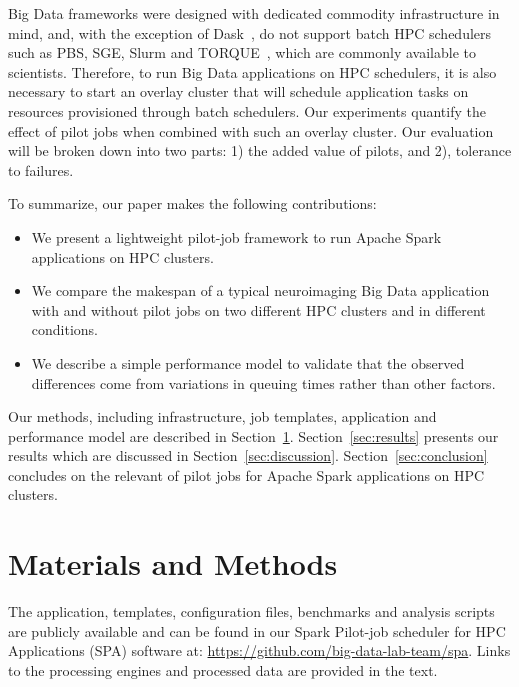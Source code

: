 \documentclass{IEEEtran}
\begin{document}
Big Data frameworks were designed with dedicated commodity infrastructure
in mind, and, with the exception of Dask~\cite{rocklin2015dask}, do not support batch
HPC schedulers such as PBS, SGE, Slurm and TORQUE~\cite{schedulers}, which
are commonly available to scientists. Therefore, to run Big Data
applications on HPC schedulers, it is also necessary to start an overlay
cluster that will schedule application tasks on resources provisioned
through batch schedulers. Our experiments quantify the effect of pilot jobs
when combined with such an overlay cluster. Our evaluation will be broken
down into two parts:
1) the added value of pilots, and 2), tolerance to failures.

To summarize, our paper
makes the following contributions:
\begin{itemize}
\item We present a lightweight pilot-job framework to run Apache Spark
applications on HPC clusters.
\item We compare the makespan of a typical neuroimaging Big Data
application with and without pilot jobs on two different HPC clusters and
in different conditions.
\item We describe a simple performance model to validate that the observed
differences come from variations in queuing times rather than other
factors.
\end{itemize}
Our methods, including infrastructure, job templates, application and
performance model are described in Section~\ref{sec:methods}.
Section~\ref{sec:results} presents our results which are discussed in
Section~\ref{sec:discussion}. Section~\ref{sec:conclusion} concludes on the 
relevant of pilot jobs for Apache Spark applications on HPC clusters.

\section{Materials and Methods}\label{sec:methods}

    The application, templates, configuration files, benchmarks and
    analysis scripts are publicly available and can be found in our Spark
    Pilot-job scheduler for HPC Applications (SPA) software at:
    \href{https://github.com/big-data-lab-team/spa}{https://github.com/big-data-lab-team/spa}.
    Links to the processing engines and processed data are provided in the
    text.
    
\end{document}
